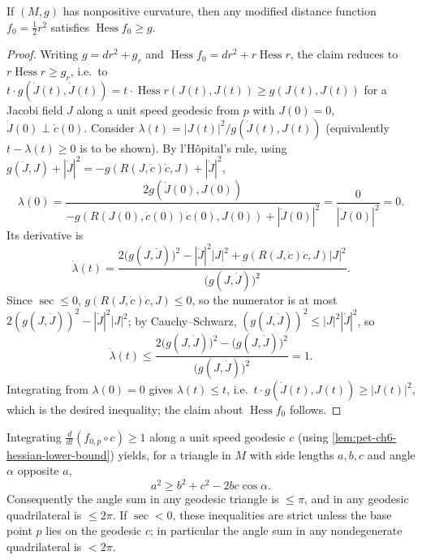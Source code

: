 \begin{lemma}[Lemma 6.2.5]
  \label{lem:pet-ch6-hessian-lower-bound}
  If $(M,g)$ has nonpositive curvature, then any modified distance function
  $f_0=\tfrac12r^2$ satisfies $\operatorname{Hess}f_0\ge g$.
\end{lemma}
\begin{proof}
  Writing $g=dr^2+g_r$ and $\operatorname{Hess}f_0=dr^2+r\operatorname{Hess}r$, the claim reduces
  to $r\operatorname{Hess}r\ge g_r$, i.e.\ to
  $t\cdot g(\dot J(t),\dot J(t))=t\cdot\operatorname{Hess}r(J(t),J(t))\ge g(J(t),J(t))$
  for a Jacobi field $J$ along a unit speed geodesic from $p$ with $J(0)=0$,
  $\dot J(0)\perp\dot c(0)$. Consider
  $\lambda(t)=|J(t)|^2/g(\dot J(t),J(t))$ (equivalently
  $t-\lambda(t)\ge0$ is to be shown). By l'H\^opital's rule, using
  $g(\ddot J,J)+|\dot J|^2=-g(R(J,\dot c)\dot c,J)+|\dot J|^2$,
  \[
    \lambda(0)=\frac{2g(\dot J(0),J(0))}{-g(R(J(0),\dot c(0))\dot c(0),J(0))+|\dot J(0)|^2}
    =\frac{0}{|\dot J(0)|^2}=0.
  \]
  Its derivative is
  \[
    \dot\lambda(t)=\frac{2\big(g(J,\dot J)\big)^2-|\dot J|^2|J|^2+g(R(J,\dot c)\dot c,J)|J|^2}
    {\big(g(J,\dot J)\big)^2}.
  \]
  Since $\sec\le0$, $g(R(J,\dot c)\dot c,J)\le0$, so the numerator is at most
  $2(g(J,\dot J))^2-|\dot J|^2|J|^2$; by Cauchy--Schwarz,
  $(g(J,\dot J))^2\le|J|^2|\dot J|^2$, so
  \[
    \dot\lambda(t)\le\frac{2\big(g(J,\dot J)\big)^2-\big(g(J,\dot J)\big)^2}{\big(g(J,\dot J)\big)^2}=1.
  \]
  Integrating from $\lambda(0)=0$ gives $\lambda(t)\le t$, i.e.\
  $t\cdot g(\dot J(t),J(t))\ge|J(t)|^2$, which is the desired inequality; the
  claim about $\operatorname{Hess}f_0$ follows.
\end{proof}

\begin{remark}
  \label{rem:pet-ch6-triangle-comparison}
  Integrating $\frac{d}{dt}(f_{0,p}\circ c)\ge1$ along a unit speed geodesic
  $c$ (using \cref{lem:pet-ch6-hessian-lower-bound}) yields, for a triangle in
  $M$ with side lengths $a,b,c$ and angle $\alpha$ opposite $a$,
  \[
    a^2\ge b^2+c^2-2bc\cos\alpha.
  \]
  Consequently the angle sum in any geodesic triangle is $\le\pi$, and in any
  geodesic quadrilateral is $\le2\pi$. If $\sec<0$, these inequalities are
  strict unless the base point $p$ lies on the geodesic $c$; in particular the
  angle sum in any nondegenerate quadrilateral is $<2\pi$.
\end{remark}

